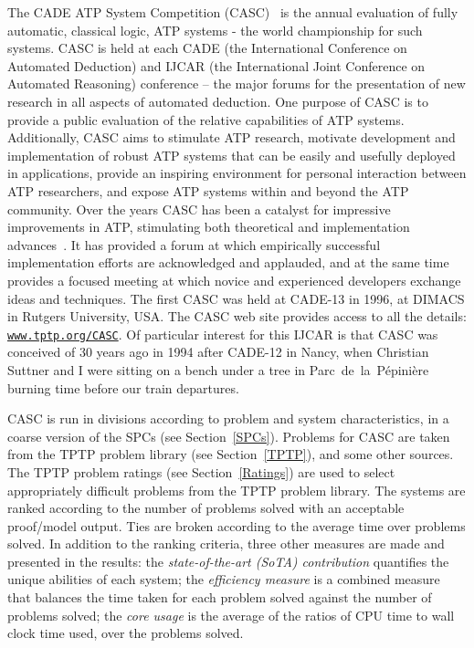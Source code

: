 \documentclass{easychair}
\begin{document}
The CADE ATP System Competition (CASC)~\cite{Sut16} is the annual evaluation of fully automatic,
classical logic, ATP systems - the world championship for such systems.
CASC is held at each CADE (the International Conference on Automated Deduction) and IJCAR
(the International Joint Conference on Automated Reasoning) conference -- the major forums
for the presentation of new research in all aspects of automated deduction.
One purpose of CASC is to provide a public evaluation of the relative capabilities of ATP systems.
Additionally, CASC aims to
stimulate ATP research,
motivate development and implementation of robust ATP systems that can be easily and usefully
deployed in applications,
provide an inspiring environment for personal interaction between ATP researchers,
and
expose ATP systems within and beyond the ATP community.
Over the years CASC has been a catalyst for impressive improvements in ATP, stimulating both 
theoretical and implementation advances~\cite{Nie02-Paper}.
It has provided a forum at which empirically successful implementation efforts are acknowledged 
and applauded, and at the same time provides a focused meeting at which novice and experienced 
developers exchange ideas and techniques. 
The first CASC was held at CADE-13 in 1996, at DIMACS in Rutgers University, USA.
The CASC web site provides access to all the details:
\href{http://www.tptp.org/CASC/}{{\tt www.tptp.org/CASC}}.
Of particular interest for this IJCAR is that CASC was conceived of 30 years ago in 1994 after 
CADE-12 in Nancy, when Christian Suttner and I were sitting on a bench under a tree in 
Parc~de~la~Pépinière burning time before our train departures.

CASC is run in divisions according to problem and system characteristics, in a coarse version
of the SPCs (see Section~\ref{SPCs}).
Problems for CASC are taken from the TPTP problem library (see Section~\ref{TPTP}), and some 
other sources. 
The TPTP problem ratings (see Section~\ref{Ratings}) are used to select appropriately difficult
problems from the TPTP problem library.
The systems are ranked according to the number of problems solved with an acceptable proof/model 
output.
Ties are broken according to the average time over problems solved.
In addition to the ranking criteria, three other measures are made and presented in the results:
the {\em state-of-the-art (SoTA) contribution} quantifies the unique abilities of each system;
the {\em efficiency measure} is a combined measure that balances the time taken for each problem 
solved against the number of problems solved;
the {\em core usage} is the average of the ratios of CPU time to wall clock time used, over the 
problems solved.
\end{document}

